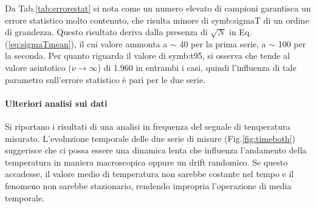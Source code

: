 Da Tab.\ref{tab:errorestat} si nota come un numero elevato di campioni garantisca un errore statistico molto contenuto, che risulta minore di \gls{symb:sigmaT} di un ordine di grandezza. Questo risultato deriva dalla presenza di $\sqrt{N}$ in Eq.(\ref{eq:sigmaTmean}), il cui valore ammonta a $\sim$ 40 per la prima serie, a $\sim$ 100 per la seconda. Per quanto riguarda il valore di \gls{symb:t95}, si osserva che tende al valore asintotico ($\nu \rightarrow \infty $) di 1.960 in entrambi i casi, quindi l'influenza di tale parametro sull'errore statistico è pari per le due serie.

\paragraph{Ulteriori analisi sui dati}
Si riportano i risultati di una analisi in frequenza del segnale di temperatura misurato. L'evoluzione temporale delle due serie di misure (Fig.\ref{fig:timeboth}) suggerisce che ci possa essere una dinamica lenta che influenza l'andamento della temperatura in maniera macroscopica oppure un drift randomico. Se questo accadesse, il valore medio di temperatura non sarebbe costante nel tempo e il fenomeno non sarebbe stazionario, rendendo impropria l'operazione di media temporale.   

